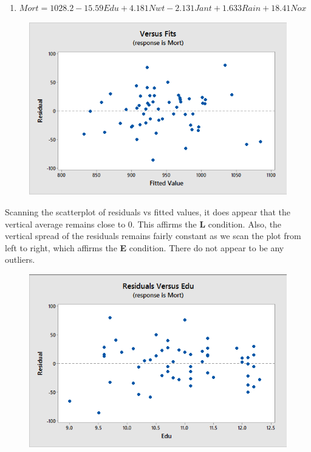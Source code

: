 \documentclass{article}
\providecommand{\tightlist}{%
      \setlength{\itemsep}{0pt}\setlength{\parskip}{0pt}}
\begin{document}
\begin{enumerate}
\def\labelenumi{\alph{enumi})}
\setcounter{enumi}{2}
\tightlist
\item
  \(Mort = 1028.2 - 15.59 Edu + 4.181 Nwt - 2.131 Jant + 1.633 Rain + 18.41 Nox\)
\end{enumerate}


\begin{figure}[h!]
 \centering
 \includegraphics[scale=.5]{./images/scatterplot_residuals-vs-fitted.png}
\end{figure}

Scanning the scatterplot
of residuals vs fitted values, it does appear that the vertical average
remains close to 0. This affirms the \textbf{L} condition. Also, the
vertical spread of the residuals remains fairly constant as we scan the
plot from left to right, which affirms the \textbf{E} condition. There
do not appear to be any outliers.

\begin{figure}[h!]
 \centering
 \includegraphics[scale=.5]{./images/scatterplot_residuals-vs-Edu.png}
\end{figure}
\end{document}
